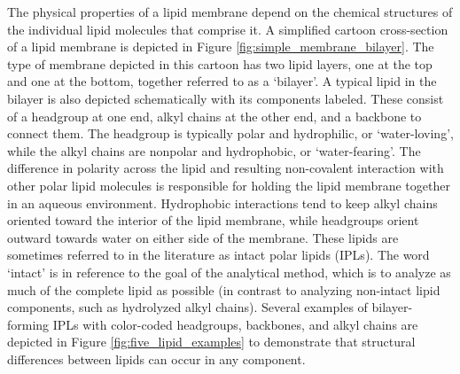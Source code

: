 The physical properties of a lipid membrane depend on the chemical structures of the individual lipid molecules that comprise it. A simplified cartoon cross-section of a lipid membrane is depicted in Figure \ref{fig:simple_membrane_bilayer}.
The type of membrane depicted in this cartoon has two lipid layers, one at the top and one at the bottom, together referred to as a `bilayer'. A typical lipid in the bilayer is also depicted schematically with its components labeled. These consist of a headgroup at one end, alkyl chains at the other end, and a backbone to connect them. The headgroup is typically polar and hydrophilic, or `water-loving', while the alkyl chains are nonpolar and hydrophobic, or `water-fearing'. The difference in polarity across the lipid and resulting non-covalent interaction with other polar lipid molecules is responsible for holding the lipid membrane together in an aqueous environment. Hydrophobic interactions tend to keep alkyl chains oriented toward the interior of the lipid membrane, while headgroups orient outward towards water on either side of the membrane. These lipids are sometimes referred to in the literature as intact polar lipids (IPLs). The word `intact' is in reference to the goal of the analytical method, which is to analyze as much of the complete lipid as possible (in contrast to analyzing non-intact lipid components, such as hydrolyzed alkyl chains). Several examples of bilayer-forming IPLs with color-coded headgroups, backbones, and alkyl chains are depicted in Figure \ref{fig:five_lipid_examples} to demonstrate that structural differences between lipids can occur in any component.
